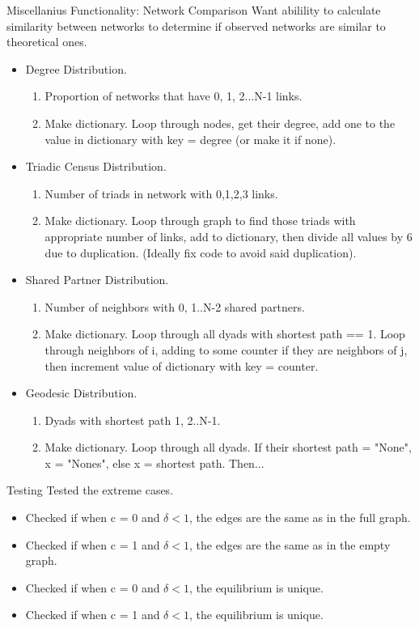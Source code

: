 \documentclass{beamer}
\begin{document}
\begin{frame}[shrink]{Miscellanius Functionality: Network Comparison}
Want abilility to calculate similarity between networks to determine if observed networks are similar to theoretical ones.
\begin{itemize}
\item Degree Distribution.
\begin{enumerate}
\item Proportion of networks that have 0, 1, 2...N-1 links.
\item Make dictionary. Loop through nodes, get their degree, add one to the value in dictionary with key = degree (or make it if none).
\end{enumerate}
\item Triadic Census Distribution.
\begin{enumerate}
\item Number of triads in network with 0,1,2,3 links.
\item Make dictionary. Loop through graph to find those triads with appropriate number of links, add to dictionary, then divide all values by 6 due to duplication. (Ideally fix code to avoid said duplication).
\end{enumerate}
\item Shared Partner Distribution.
\begin{enumerate}
\item Number of neighbors with 0, 1..N-2 shared partners.
\item Make dictionary. Loop through all dyads with shortest path == 1. Loop through neighbors of i, adding to some counter if they are neighbors of j, then increment value of dictionary with key = counter.
\end{enumerate}
\item Geodesic Distribution.
\begin{enumerate}
\item Dyads with shortest path 1, 2..N-1.
\item Make dictionary. Loop through all dyads. If their shortest path = "None", x = "Nones", else x = shortest path. Then...
\end{enumerate}

\end{itemize}
\end{frame}

\begin{frame}{Testing}
Tested the extreme cases.
\begin{itemize}
\item Checked if when c = 0 and $\delta<1$, the edges are the same as in the full graph.
\item Checked if when c = 1 and $\delta<1$, the edges are the same as in the empty graph.
\item Checked if when c = 0 and $\delta<1$, the equilibrium is unique.
\item Checked if when c = 1 and $\delta<1$, the equilibrium is unique.
\end{itemize}
\end{frame}
\end{document}
